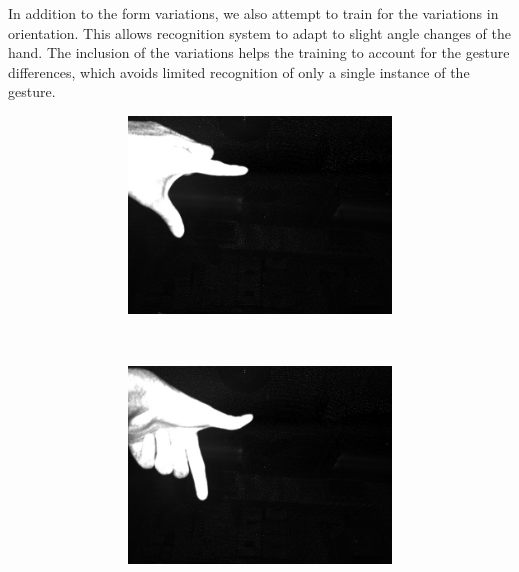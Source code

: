 In addition to the form variations, we also attempt to train for the variations in orientation. This allows recognition system to adapt to slight angle changes of the hand. The inclusion of the variations helps the training to account for the gesture differences, which avoids limited recognition of only a single instance of the gesture.%
%
\begin{figure}
\centering
\begin{subfigure}[b]{0.33\columnwidth}
    \centering
    \begin{subfigure}[b]{\columnwidth}
    \centering
    \includegraphics[width=0.98\columnwidth]{ch5/figs/upper_left_1.png}
    \end{subfigure}
    \\
    \vspace{1pt}
    \begin{subfigure}[b]{\columnwidth}
    \centering
    \includegraphics[width=0.98\columnwidth]{ch5/figs/upper_left_2.png}

\end{subfigure}
\end{subfigure}
\end{figure}
